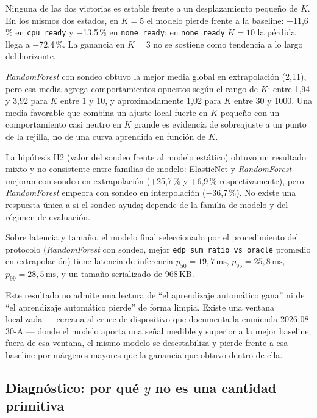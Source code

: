 \documentclass[12pt,oneside,spanish]{book}
\begin{document}
Ninguna de las dos victorias es estable frente a un desplazamiento pequeño de $K$. En los mismos dos estados, en $K=5$ el modelo pierde frente a la baseline: $-$11,6\,\% en \texttt{cpu\_ready} y $-$13,5\,\% en \texttt{none\_ready}; en \texttt{none\_ready} $K=10$ la pérdida llega a $-$72,4\,\%. La ganancia en $K=3$ no se sostiene como tendencia a lo largo del horizonte.

\textit{RandomForest} con sondeo obtuvo la mejor media global en extrapolación (2,11), pero esa media agrega comportamientos opuestos según el rango de $K$: entre 1,94 y 3,92 para $K$ entre 1 y 10, y aproximadamente 1,02 para $K$ entre 30 y 1000. Una media favorable que combina un ajuste local fuerte en $K$ pequeño con un comportamiento casi neutro en $K$ grande es evidencia de sobreajuste a un punto de la rejilla, no de una curva aprendida en función de $K$.

La hipótesis H2 (valor del sondeo frente al modelo estático) obtuvo un resultado mixto y no consistente entre familias de modelo: ElasticNet y \textit{RandomForest} mejoran con sondeo en extrapolación ($+$25,7\,\% y $+$6,9\,\% respectivamente), pero \textit{RandomForest} empeora con sondeo en interpolación ($-$36,7\,\%). No existe una respuesta única a si el sondeo ayuda; depende de la familia de modelo y del régimen de evaluación.

Sobre latencia y tamaño, el modelo final seleccionado por el procedimiento del protocolo (\textit{RandomForest} con sondeo, mejor \texttt{edp\_sum\_ratio\_vs\_oracle} promedio en extrapolación) tiene latencia de inferencia $p_{50}=19,7\,\text{ms}$, $p_{95}=25,8\,\text{ms}$, $p_{99}=28,5\,\text{ms}$, y un tamaño serializado de 968\,KB.

Este resultado no admite una lectura de ``el aprendizaje automático gana'' ni de ``el aprendizaje automático pierde'' de forma limpia. Existe una ventana localizada --- cercana al cruce de dispositivo que documenta la enmienda 2026-08-30-A --- donde el modelo aporta una señal medible y superior a la mejor baseline; fuera de esa ventana, el mismo modelo se desestabiliza y pierde frente a esa baseline por márgenes mayores que la ganancia que obtuvo dentro de ella.
\fi

\subsection{Diagnóstico: por qué \texorpdfstring{$y$}{y} no es una cantidad primitiva}
\label{sec:resultados-r2-diagnostico}
\end{document}
